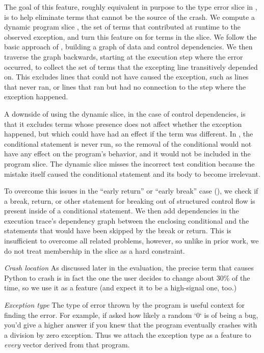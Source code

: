 \documentclass[conference]{IEEEtran}
\begin{document}
The goal of this feature, roughly equivalent in purpose to the type error slice in
\cite {learning-to-blame}, is to help eliminate terms that cannot be the source of
the crash. We compute a dynamic program slice \cite{KOREL1988155}, the set of
terms that contributed at runtime to the observed exception, and turn this
feature on for terms in the slice. We follow the basic approach of
\cite{KOREL1988155, KOREL1990187}, building a graph of data and control
dependencies. We then traverse the graph backwards, starting at the execution
step where the error occurred, to collect the set of terms that the excepting
line transitively depended on. This excludes lines that could not have caused the
exception, such as lines that never ran, or lines that ran but had no connection
to the step where the exception happened.

A downside of using the dynamic slice, in the case of control dependencies, is
that it excludes terms whose presence does not affect whether the exception
happened, but which could have had an effect if the term was different. In
, the conditional statement is never run, so the
removal of the conditional would not have any effect on the program's behavior,
and it would not be included in the program slice. The dynamic slice misses the
incorrect test condition because the mistake itself caused the conditional
statement and its body to become irrelevant.

To overcome this issues in the ``early return'' or ``early break'' case
(), we check if a break, return, or other statement for
breaking out of structured control flow is present inside of a conditional
statement. We then add dependencies in the execution trace's dependency graph
between the enclosing conditional and the statements that would have been skipped
by the break or return. This is insufficient to overcome all related problems,
however, so unlike in prior work, we do not treat membership in the slice
as a hard constraint.

\emph{Crash location} As discussed later in the evaluation, the precise term that
causes Python to crash is in fact the one the user decides to change about 30\% of
the time, so we use it as a feature (and expect it to be a high-signal one, too.)

\emph{Exception type} The type of error thrown by the program is useful context for
finding the error. For example, if asked how likely a random `0` is of being a bug, you'd give
a higher answer if you knew that the program eventually crashes with a division by
zero exception. Thus we attach the exception type as a feature to \emph{every}
vector derived from that program.
\end{document}
